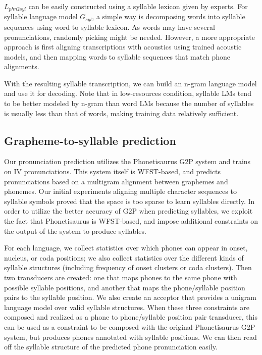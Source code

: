 \documentclass[journal]{IEEEtran}
\begin{document}
$L_{phn2syl}$ can be easily constructed using a syllable lexicon given by experts. For syllable language model 
$G_{syl}$, a simple way is decomposing words into syllable sequences using word to syllable lexicon. 
As words may have several pronunciations, randomly picking might be needed. However, a more appropriate approach 
is first aligning transcriptions with acoustics using trained acoustic models, and then mapping words 
to syllable sequences that match phone alignments.

With the resulting syllable transcription, we can build an n-gram language model and use it for decoding. 
Note that in low-resources condition, syllable LMs tend to be better modeled by n-gram than word LMs 
because the number of syllables is usually less than that of words, making training data relatively sufficient.

\subsection{Grapheme-to-syllable prediction}
Our pronunciation prediction utilizes the Phonetisaurus G2P system \cite{novak2012wfst} and trains on IV 
pronunciations. This system itself is WFST-based, and predicts pronunciations based on a multigram alignment 
between graphemes and phonemes. Our initial experiments aligning multiple character sequences to syllable 
symbols proved that the space is too sparse to learn syllables directly. In order to utilize the better 
accuracy of G2P when predicting syllables, we exploit the fact that Phonetisaurus is WFST-based, and 
impose additional constraints on the output of the system to produce syllables. 

For each language, we collect statistics over which phones can appear in onset, nucleus, or coda positions; 
we also collect statistics over the different kinds of syllable structures (including frequency of onset 
clusters or coda clusters). Then two transducers are created: one that maps phones to the same phone with 
possible syllable positions, and another that maps the phone/syllable position pairs to the syllable 
position.  We also create an acceptor that provides a unigram language model over valid syllable structures.
When these three constraints are composed and realized as a phone to phone/syllable position pair transducer, 
this can be used as a constraint to be composed with the original Phonetisaurus G2P system, but produces phones 
annotated with syllable positions.  We can then read off the syllable structure of the  predicted phone 
pronunciation easily.
\end{document}
